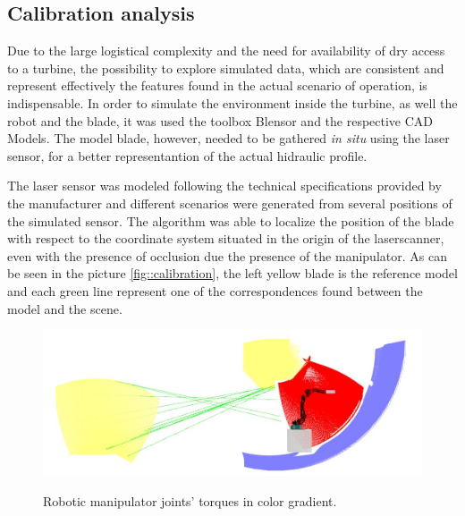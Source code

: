 

\subsection{Calibration analysis}

Due to the large logistical complexity and the need for availability of
dry access to a turbine, the possibility to explore simulated data, which are
consistent and represent effectively the features found in the actual scenario
of operation, is indispensable. In order to simulate the environment inside the
turbine, as well the robot and the blade, it was used the toolbox Blensor
\cite{Gschwandtner11b} and the respective CAD Models. The model blade, however, needed
to be gathered \textit{in situ} using the laser sensor, for a better
representantion of the actual hidraulic profile.

The laser sensor was modeled following the technical specifications provided by
the manufacturer and different scenarios were generated from several positions
of the simulated sensor. The algorithm was able to localize the position of the
blade with respect to the coordinate system situated in the origin of the
laserscanner, even with the presence of occlusion due the presence of the
manipulator. As can be seen in the picture \ref{fig::calibration}, 
the left yellow blade is the reference model and each green line represent one
of the correspondences found between the model and the scene. 

\begin{figure}
	\centering
	\includegraphics[width=.95\columnwidth]{figs/results/sim_mh12_sp}
    \label{fig:torques}
    \caption{Robotic manipulator joints' torques in color gradient.}
\end{figure}

